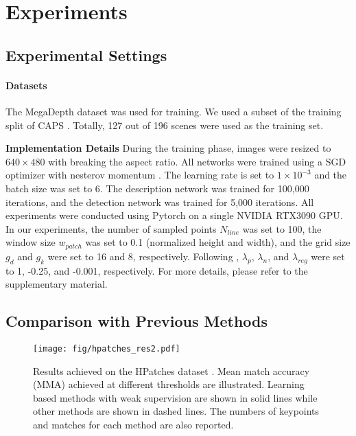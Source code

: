 \documentclass[10pt,twocolumn,letterpaper]{article}
\begin{document}
\section{Experiments}
\subsection{Experimental Settings}
\paragraph{Datasets} The MegaDepth dataset \cite{li2018megadepth} was used for training. We used a subset of the training split of CAPS \cite{wangLearningFeatureDescriptors2020}. Totally, 127 out of 196 scenes were used as the training set. 

\noindent\textbf{Implementation Details} 
During the training phase, images were resized to $640\times480$ with breaking the aspect ratio. All networks were trained using a SGD optimizer with nesterov momentum \cite{sutskever2013importance}. The learning rate is set to $1\times 10^{-3}$ and the batch size was set to 6. The description network was trained for 100,000 iterations, and the detection network was trained for 5,000 iterations. All experiments were conducted using Pytorch on a single NVIDIA RTX3090 GPU.
In our experiments, the number of sampled points $N_{line}$ was set to 100, the window size $w_{patch}$ was set to 0.1 (normalized height and width), and the grid size $g_d$ and $g_k$ were set to 16 and 8, respectively. Following \cite{tyszkiewiczDISKLearningLocal2020a}, $\lambda_{p}$, $\lambda_{n}$, and $\lambda_{reg}$ were set to 1, -0.25, and -0.001,  respectively. For more details, please refer to the supplementary material.


\subsection{Comparison with Previous Methods}
\begin{figure*}[!t]
    \centering
    \texttt{[image: fig/hpatches\_res2.pdf]}
    \caption{Results achieved on the HPatches dataset \cite{hpatches_2017_cvpr}. Mean match accuracy (MMA) achieved at different thresholds are illustrated. Learning based methods with weak supervision are shown in solid lines while other methods are shown in dashed lines. The numbers of keypoints and matches for each method are also reported.}
    \label{fig-reshpatches}
\end{figure*}
\end{document}
